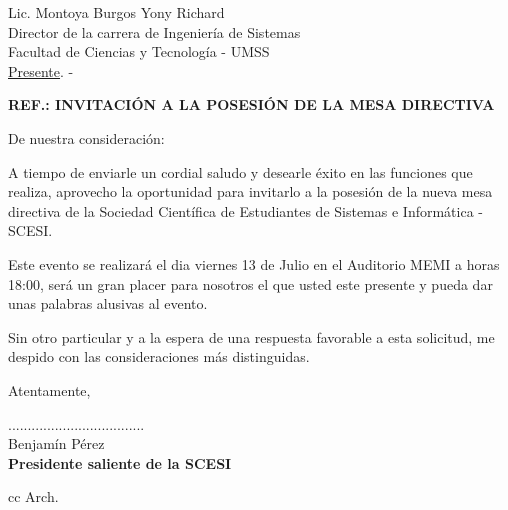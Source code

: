 \documentclass[letterpaper,12pt]{letter}
\begin{document}
\date {12 de julio de 2012}
\begin{letter}{Lic. Montoya Burgos Yony Richard \\ Director de la carrera de Ingenier\'ia de Sistemas \\ Facultad de Ciencias y Tecnolog\'ia - UMSS \\ \underline {Presente}. -}

\begin{center}
	\opening{\textbf{REF.: INVITACI\'ON A LA POSESI\'ON DE LA MESA DIRECTIVA}}
\end{center}

De nuestra consideración:

A tiempo de enviarle un cordial saludo y desearle éxito en las funciones que realiza, aprovecho 
la oportunidad para invitarlo a la posesi\'on de la nueva mesa directiva de la Sociedad Cient\'ifica 
de Estudiantes de Sistemas e Inform\'atica - SCESI.

Este evento se realizar\'a el dia viernes 13 de Julio en el Auditorio MEMI a horas 18:00, ser\'a 
un gran placer para nosotros el que usted este presente y pueda dar unas palabras alusivas al evento.

Sin otro particular y a la espera de una respuesta favorable a esta solicitud, me despido con las 
consideraciones más distinguidas.

Atentamente,

\vspace{2.5cm}

\begin{center}
...................................\\
Benjam\'in P\'erez\\
{\bfseries Presidente saliente de la SCESI}
\end{center}
\vspace{1cm}
cc Arch.
\end{letter}
\end{document}
